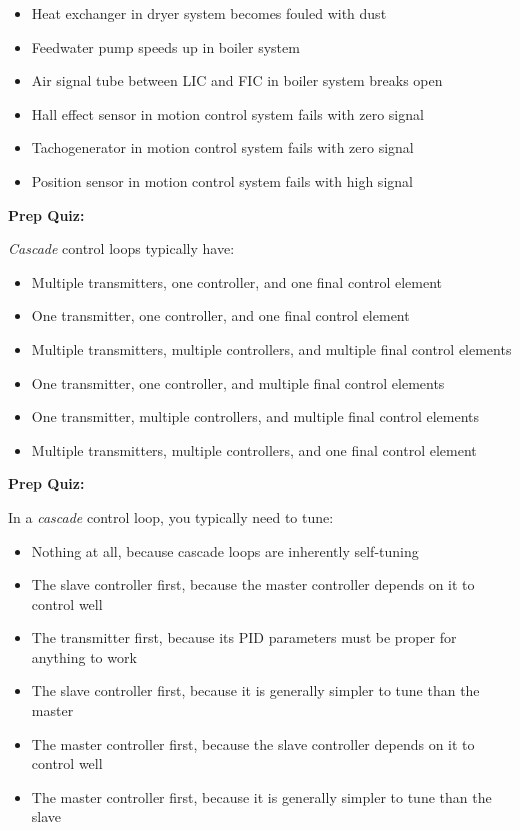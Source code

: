 \begin{itemize}
\begin{itemize}
\item{} Heat exchanger in dryer system becomes fouled with dust
\item{} Feedwater pump speeds up in boiler system
\item{} Air signal tube between LIC and FIC in boiler system breaks open
\item{} Hall effect sensor in motion control system fails with zero signal
\item{} Tachogenerator in motion control system fails with zero signal
\item{} Position sensor in motion control system fails with high signal
\end{itemize}
\end{itemize}







\vfil \eject

\noindent
{\bf Prep Quiz:}

{\it Cascade} control loops typically have:

\begin{itemize}
\item{} Multiple transmitters, one controller, and one final control element
\vskip 5pt 
\item{} One transmitter, one controller, and one final control element
\vskip 5pt 
\item{} Multiple transmitters, multiple controllers, and multiple final control elements
\vskip 5pt 
\item{} One transmitter, one controller, and multiple final control elements
\vskip 5pt 
\item{} One transmitter, multiple controllers, and multiple final control elements
\vskip 5pt 
\item{} Multiple transmitters, multiple controllers, and one final control element
\end{itemize}



\vfil \eject

\noindent
{\bf Prep Quiz:}

In a {\it cascade} control loop, you typically need to tune:

\begin{itemize}
\item{} Nothing at all, because cascade loops are inherently self-tuning
\vskip 5pt 
\item{} The slave controller first, because the master controller depends on it to control well
\vskip 5pt 
\item{} The transmitter first, because its PID parameters must be proper for anything to work
\vskip 5pt 
\item{} The slave controller first, because it is generally simpler to tune than the master
\vskip 5pt 
\item{} The master controller first, because the slave controller depends on it to control well
\vskip 5pt 
\item{} The master controller first, because it is generally simpler to tune than the slave
\end{itemize}


